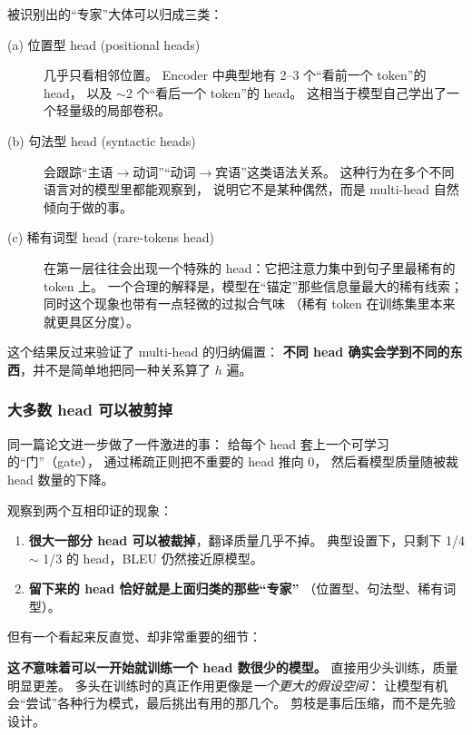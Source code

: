 被识别出的“专家”大体可以归成三类：

\begin{description}
  \item[(a) 位置型 head (positional heads)]
    几乎只看相邻位置。
    Encoder 中典型地有 2--3 个“看前一个 token”的 head，
    以及 \(\sim\)2 个“看后一个 token”的 head。
    这相当于模型自己学出了一个轻量级的局部卷积。
  \item[(b) 句法型 head (syntactic heads)]
    会跟踪“主语\(\to\)动词”“动词\(\to\)宾语”这类语法关系。
    这种行为在多个不同语言对的模型里都能观察到，
    说明它不是某种偶然，而是 multi-head 自然倾向于做的事。
  \item[(c) 稀有词型 head (rare-tokens head)]
    在第一层往往会出现一个特殊的 head：它把注意力集中到句子里最稀有的 token 上。
    一个合理的解释是，模型在“锚定”那些信息量最大的稀有线索；
    同时这个现象也带有一点轻微的过拟合气味
    （稀有 token 在训练集里本来就更具区分度）。
\end{description}

这个结果反过来验证了 multi-head 的归纳偏置：
\textbf{不同 head 确实会学到不同的东西}，并不是简单地把同一种关系算了 \(h\) 遍。

\subsubsection{大多数 head 可以被剪掉}

同一篇论文进一步做了一件激进的事：
给每个 head 套上一个可学习的“门”（gate），
通过稀疏正则把不重要的 head 推向 0，
然后看模型质量随被裁 head 数量的下降。

观察到两个互相印证的现象：

\begin{enumerate}
  \item \textbf{很大一部分 head 可以被裁掉}，翻译质量几乎不掉。
        典型设置下，只剩下 1/4 \(\sim\) 1/3 的 head，BLEU 仍然接近原模型。
  \item \textbf{留下来的 head 恰好就是上面归类的那些“专家”}
        （位置型、句法型、稀有词型）。
\end{enumerate}

但有一个看起来反直觉、却非常重要的细节：

\begin{keypointblock}
\textbf{这\emph{不}意味着可以一开始就训练一个 head 数很少的模型。}
直接用少头训练，质量明显更差。
多头在训练时的真正作用更像是\emph{一个更大的假设空间}：
让模型有机会“尝试”各种行为模式，最后挑出有用的那几个。
剪枝是事后压缩，而不是先验设计。
\end{keypointblock}

